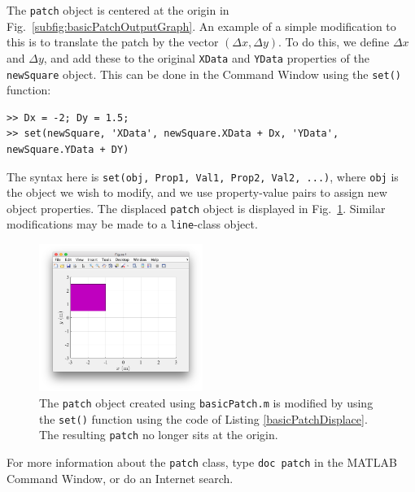 The \texttt{patch} object is centered at the origin in Fig.\ \ref{subfig:basicPatchOutputGraph}. An example of a simple modification to this is to translate the patch by the vector $(\Delta x, \Delta y)$. To do this, we define $\Delta x$ and $\Delta y$, and add these to the original \texttt{XData} and \texttt{YData} properties of the \texttt{newSquare} object. This can be done in the Command Window using the \texttt{set()} function:
\begin{lstlisting}[style=Matlab-editor,label=basicPatchDisplace,caption={A Command Window modification to the \texttt{patch} defined in Listing \ref{basicPatch}. Line 1 is used to specify the $x$- and $y$-components of the displacement. The displacement is then applied to the original \texttt{XData} and \texttt{YData} properties, and the result of the addition is the value component of a property-value pair in the \texttt{set()} function.}]
>> Dx = -2; Dy = 1.5;
>> set(newSquare, 'XData', newSquare.XData + Dx, 'YData', newSquare.YData + DY)
\end{lstlisting}
The syntax here is \verb!set(obj, Prop1, Val1, Prop2, Val2, ...)!, where \texttt{obj} is the object we wish to modify, and we use property-value pairs to assign new object properties. The displaced \texttt{patch} object is displayed in Fig.\ \ref{fig:basicPatchDisplaced}. Similar modifications may be made to a \texttt{line}-class object.

\begin{figure}[htbp] %
   \centering
   \includegraphics[width=0.475\textwidth]{graphics/basicPatchDisplaced.png}   
      \caption{The \texttt{patch} object created using \texttt{basicPatch.m} is modified by using the \texttt{set()} function using the code of Listing \ref{basicPatchDisplace}. The resulting \texttt{patch} no longer sits at the origin.}
\label{fig:basicPatchDisplaced}

\end{figure}

For more information about the \texttt{patch} class, type \texttt{doc patch} in the MATLAB Command Window, or do an Internet search.